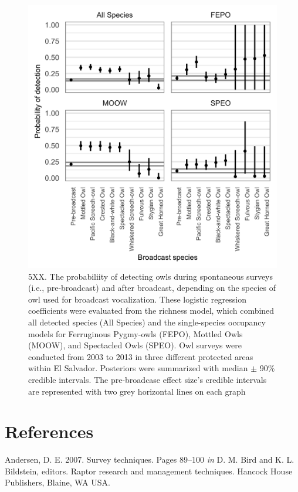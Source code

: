 \documentclass[
]{article}
\begin{document}
\begin{figure}
\centering
\includegraphics{../output/figures/p_detection-1.png}
\caption{5XX. The probabiliity of detecting owls during spontaneous
surveys (i.e., pre-broadcast) and after broadcast, depending on the
species of owl used for broadcast vocalization. These logistic
regression coefficients were evaluated from the richness model, which
combined all detected species (All Species) and the single-species
occupancy models for Ferruginous Pygmy-owls (FEPO), Mottled Owls (MOOW),
and Spectacled Owls (SPEO). Owl surveys were conducted from 2003 to 2013
in three different protected areas within El Salvador. Posteriors were
summarized with median \(\pm\) 90\% credible intervals. The
pre-broadcase effect size's credible intervals are represented with two
grey horizontal lines on each graph \label{figure6}}
\end{figure}

\hypertarget{references}{%
\section*{References}\label{references}}

\hypertarget{refs}{}
\leavevmode\hypertarget{ref-Andersen:2007}{}%
Andersen, D. E. 2007. Survey techniques. Pages 89--100 \emph{in} D. M.
Bird and K. L. Bildstein, editors. Raptor research and management
techniques. Hancock House Publishers, Blaine, WA USA.
\end{document}

